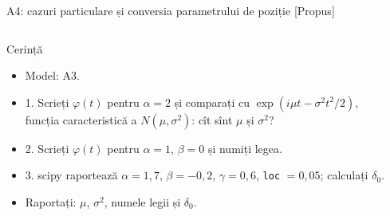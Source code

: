\begin{frame}{A4: cazuri particulare și conversia parametrului de poziție [Propus]}
\propsub
\itemsize{\footnotesize}
\begin{columns}[T]
\begin{column}{\taskw}
\begin{block}{Cerință}
\begin{itemize}
    \item Model: A3.
    \item 1. Scrieți $\varphi(t)$ pentru $\alpha = 2$ și comparați cu $\exp(i\mu t - \sigma^2 t^2/2)$, funcția caracteristică a $N(\mu, \sigma^2)$: cît sînt $\mu$ și $\sigma^2$?
    \item 2. Scrieți $\varphi(t)$ pentru $\alpha = 1$, $\beta = 0$ și numiți legea.
    \item 3. scipy raportează $\alpha = 1{,}7$, $\beta = -0{,}2$, $\gamma = 0{,}6$, \texttt{loc} $= 0{,}05$; calculați $\delta_0$.
    \item Raportați: $\mu$, $\sigma^2$, numele legii și $\delta_0$.
\end{itemize}
\end{block}
\end{column}
\begin{column}{\solw}
\end{column}
\end{columns}
\end{frame}

